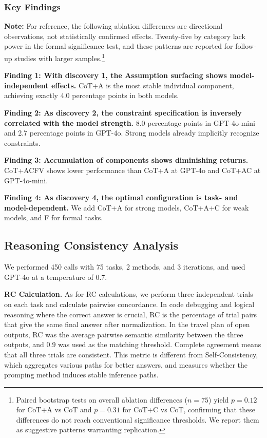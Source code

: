 \documentclass[11pt,a4paper]{article}
\begin{document}
\subsubsection{Key Findings}

\textbf{Note:} For reference, the following ablation differences are directional observations, not statistically confirmed effects. Twenty-five by category lack power in the formal significance test, and these patterns are reported for follow-up studies with larger samples.\footnote{Paired bootstrap tests on overall ablation differences ($n=75$) yield $p=0.12$ for CoT+A vs CoT and $p=0.31$ for CoT+C vs CoT, confirming that these differences do not reach conventional significance thresholds. We report them as suggestive patterns warranting replication.}

\textbf{Finding 1: With discovery 1, the Assumption surfacing shows model-independent effects.} CoT+A is the most stable individual component, achieving exactly 4.0 percentage points in both models.

\textbf{Finding 2: As discovery 2, the constraint specification is inversely correlated with the model strength.} 8.0 percentage points in GPT-4o-mini and 2.7 percentage points in GPT-4o. Strong models already implicitly recognize constraints.

\textbf{Finding 3: Accumulation of components shows diminishing returns.} CoT+ACFV shows lower performance than CoT+A at GPT-4o and CoT+AC at GPT-4o-mini.

\textbf{Finding 4: As discovery 4, the optimal configuration is task- and model-dependent.} We add CoT+A for strong models, CoT+A+C for weak models, and F for formal tasks.

\subsection{Reasoning Consistency Analysis}

We performed 450 calls with 75 tasks, 2 methods, and 3 iterations, and used GPT-4o at a temperature of 0.7.

\textbf{RC Calculation.} As for RC calculations, we perform three independent trials on each task and calculate pairwise concordance. In code debugging and logical reasoning where the correct answer is crucial, RC is the percentage of trial pairs that give the same final answer after normalization. In the travel plan of open outputs, RC was the average pairwise semantic similarity between the three outputs, and 0.9 was used as the matching threshold. Complete agreement means that all three trials are consistent. This metric is different from Self-Consistency, which aggregates various paths for better answers, and measures whether the promping method induces stable inference paths.
\end{document}

